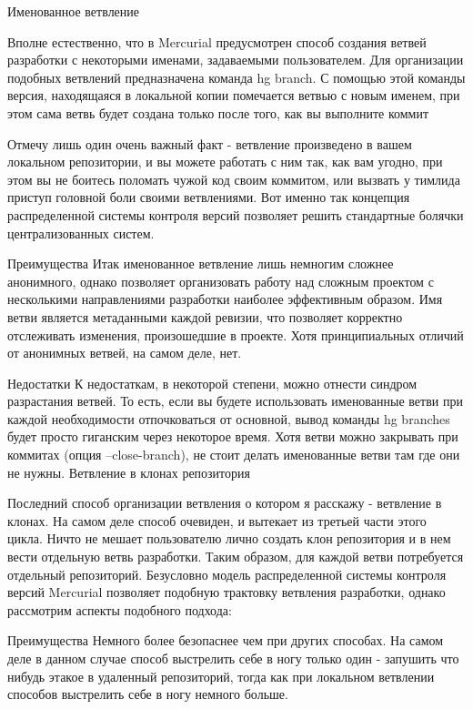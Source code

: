 \documentclass{../industrial-development}
\begin{document}
Именованное ветвление

Вполне естественно, что в Mercurial предусмотрен способ создания ветвей разработки с некоторыми именами, задаваемыми пользователем. Для организации подобных ветвлений предназначена команда hg branch. С помощью этой команды версия, находящаяся в локальной копии помечается ветвью с новым именем, при этом сама ветвь будет создана только после того, как вы выполните коммит

Отмечу лишь один очень важный факт - ветвление произведено в вашем локальном репозитории, и вы можете работать с ним так, как вам угодно, при этом вы не боитесь поломать чужой код своим коммитом, или вызвать у тимлида приступ головной боли своими ветвлениями. Вот именно так концепция распределенной системы контроля версий позволяет решить стандартные болячки централизованных систем.

Преимущества
Итак именованное ветвление лишь немногим сложнее анонимного, однако позволяет организовать работу над сложным проектом с несколькими направлениями разработки наиболее эффективным образом. Имя ветви является метаданными каждой ревизии, что позволяет корректно отслеживать изменения, произошедшие в проекте. Хотя принципиальных отличий от анонимных ветвей, на самом деле, нет.

Недостатки
К недостаткам, в некоторой степени, можно отнести синдром разрастания ветвей. То есть, если вы будете использовать именованные ветви при каждой необходимости отпочковаться от основной, вывод команды hg branches будет просто гиганским через некоторое время. Хотя ветви можно закрывать при коммитах (опция --close-branch), не стоит делать именованные ветви там где они не нужны.
Ветвление в клонах репозитория

Последний способ организации ветвления о котором я расскажу - ветвление в клонах. На самом деле способ очевиден, и вытекает из третьей части этого цикла. Ничто не мешает пользователю лично создать клон репозитория и в нем вести отдельную ветвь разработки. Таким образом, для каждой ветви потребуется отдельный репозиторий. Безусловно модель распределенной системы контроля версий Mercurial позволяет подобную трактовку ветвления разработки, однако рассмотрим аспекты подобного подхода:

Преимущества
Немного более безопаснее чем при других способах. На самом деле в данном случае способ выстрелить себе в ногу только один - запушить что нибудь этакое в удаленный репозиторий, тогда как при локальном ветвлении способов выстрелить себе в ногу немного больше.
\end{document}
